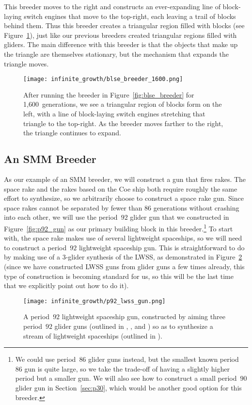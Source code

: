 This breeder moves to the right and constructs an ever-expanding line of block-laying switch engines that move to the top-right, each leaving a trail of blocks behind them. Thus this breeder creates a triangular region filled with blocks (see Figure~\ref{fig:blse_breeder_1600}), just like our previous breeders created triangular regions filled with gliders. The main difference with this breeder is that the objects that make up the triangle are themselves stationary, but the mechanism that expands the triangle moves.
\begin{figure}[!ht]
	\centering\texttt{[image: infinite\_growth/blse\_breeder\_1600.png]}
	\caption{After running the breeder in Figure~\ref{fig:blse_breeder} for 1,600~generations, we see a triangular region of blocks form on the left, with a line of block-laying switch engines stretching that triangle to the top-right. As the breeder moves farther to the right, the triangle continues to expand.}\label{fig:blse_breeder_1600}
\end{figure}


\subsection{An SMM Breeder}\label{sec:smm_breeder}

As our example of an SMM breeder, we will construct a gun that fires rakes. The space rake and the rakes based on the Coe ship both require roughly the same effort to synthesize, so we arbitrarily choose to construct a space rake gun. Since space rakes cannot be separated by fewer than $86$ generations without crashing into each other, we will use the period~$92$ glider gun that we constructed in Figure~\ref{fig:p92_gun} as our primary building block in this breeder.\footnote{We could use period~$86$ glider guns instead, but the smallest known period~$86$ gun is quite large, so we take the trade-off of having a slightly higher period but a smaller gun. We will also see how to construct a small period~$90$ glider gun in Section~\ref{sec:p30}, which would be another good option for this breeder.} To start with, the space rake makes use of several lightweight spaceships, so we will need to construct a period~$92$ lightweight spaceship gun. This is straightforward to do by making use of a $3$-glider synthesis of the LWSS, as demonstrated in Figure~\ref{fig:p92_lwss_gun} (since we have constructed LWSS guns from glider guns a few times already, this type of construction is becoming standard for us, so this will be the last time that we explicitly point out how to do it).
\begin{figure}[!ht]
	\centering\texttt{[image: infinite\_growth/p92\_lwss\_gun.png]}
	\caption{A period~$92$ lightweight spaceship gun, constructed by aiming three period~$92$ glider guns (outlined in , , and ) so as to synthesize a stream of lightweight spaceships (outlined in ).}\label{fig:p92_lwss_gun}
\end{figure}

